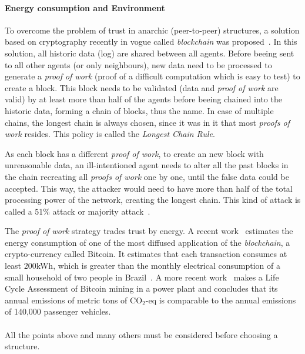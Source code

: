 \documentclass[../main.tex]{subfiles}
\begin{document}
\paragraph{Energy consumption and Environment}
To overcome the problem of trust in anarchic (peer-to-peer) structures, a solution based on cryptography recently in vogue called \emph{blockchain} was proposed~\cite{Nakamoto2008}.
In this solution, all historic data (log) are shared between all agents.
Before beeing sent to all other agents (or only neighbours), new data need to be processed to generate a \emph{proof of work} (proof of a difficult computation which is easy to test) to create a block.
This block needs to be validated (data and \emph{proof of work} are valid) by at least more than half of the agents before beeing chained into the historic data, forming a chain of blocks, thus the name.
In case of multiple chains, the longest chain is always chosen, since it was in it that most \emph{proofs of work} resides. This policy is called the \emph{Longest Chain Rule}.

As each block has a different \emph{proof of work}, to create an new block with unreasonable data, an ill-intentioned agent needs to alter all the past blocks in the chain recreating all \emph{proofs of work} one by one, until the false data could be accepted.
This way, the attacker would need to have more than half of the total processing power of the network, creating the longest chain. This kind of attack is called a 51\% attack or majority attack~\cite{CilloniEtAl2020}.

The \emph{proof of work} strategy trades trust by energy.
A recent work~\cite{ColeCheng2018} estimates the energy consumption of one of the most diffused application of the \emph{blockchain}, a crypto-currency called Bitcoin.
It estimates that each transaction consumes at least $200$kWh, which is greater than the monthly electrical consumption of a small household of two people in Brazil~\cite{EPE2022}.
A more recent work~\cite{RoeckDrennen2022} makes a Life Cycle Assessment of Bitcoin mining in a power plant and concludes that its annual emissions of metric tons of CO$_2$-eq is comparable to the annual emissions of 140,000 passenger vehicles.
\\~\\
All the points above and many others must be considered before choosing a structure.


\end{document}
